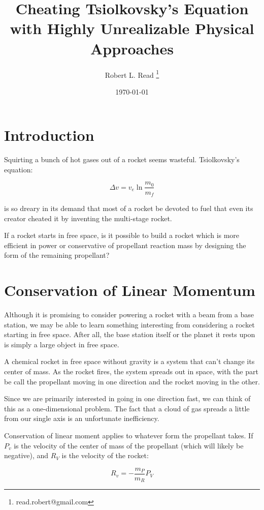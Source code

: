 \documentclass[11pt]{article}
\title{Cheating Tsiolkovsky's Equation with Highly Unrealizable Physical Approaches}
\author{Robert L. Read
  \thanks{read.robert@gmail.com}
}
\affil{Founder, Public Invention, an educational non-profit.}
\date{\today}
\begin{document}
\maketitle


\section{Introduction}

Squirting a bunch of hot gases out of a rocket seems wasteful.
Tsiolkovsky's equation:

\[
\tag{The Rocket Equation} \Delta v = v_e \ln \frac{m_0}{m_f} 
\]

is so dreary in its demand that most of a rocket be devoted to fuel
that even its creator cheated it by inventing the multi-stage rocket.

If a rocket starts in free space, 
is it possible to build a rocket which is more efficient in power or
conservative of propellant reaction mass by designing the form
of the remaining propellant?

\section{Conservation of Linear Momentum}

Although it is promising to consider powering a rocket with a beam
from a base station, we may be able to learn something interesting from
considering a rocket starting in free space. After all, the base station
itself or the planet it rests upon is simply a large object in free space.



A chemical rocket in free space without gravity is a system that can't
change its center of mass. As the rocket fires, the system spreads out
in space, with the part be call the propellant moving in one direction
and the rocket moving in the other.


Since we are primarily interested in going in one direction fast, we
can think of this as a one-dimensional problem. The fact that a cloud
of gas spreads a little from our single axis is an unfortunate inefficiency.

Conservation of linear moment applies to whatever form the propellant takes.
If $P_v$ is the velocity of the center of mass of the propellant (which will
likely be negative), and $R_V$ is the velocity of the rocket:

\[
\tag{CLM} R_v = -\frac{m_P}{m_R} P_V
\]
\end{document}
